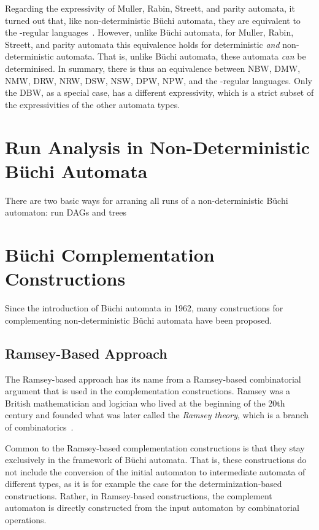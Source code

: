 Regarding the expressivity of Muller, Rabin, Streett, and parity automata, it turned out that, like non-deterministic Büchi automata, they are equivalent to the \om-regular languages~\cite{Thomas:1991}. However, unlike Büchi automata, for Muller, Rabin, Streett, and parity automata this equivalence holds for deterministic \textit{and} non-deterministic automata. That is, unlike Büchi automata, these automata \textit{can} be determinised. In summary, there is thus an equivalence between NBW, DMW, NMW, DRW, NRW, DSW, NSW, DPW, NPW, and the \om-regular languages. Only the DBW, as a special case, has a different expressivity, which is a strict subset of the expressivities of the other automata types. 



\section{Run Analysis in Non-Deterministic Büchi Automata}

There are two basic ways for arraning all runs of a non-deterministic Büchi automaton: run DAGs and trees~\cite{2014_wilke}


\section{Büchi Complementation Constructions}
Since the introduction of Büchi automata in 1962, many constructions for complementing non-deterministic Büchi automata have been proposed. 



\subsection{Ramsey-Based Approach}
The Ramsey-based approach has its name from a Ramsey-based combinatorial argument that is used in the complementation constructions. Ramsey was a British mathematician and logician who lived at the beginning of the 20th century and founded what was later called the \textit{Ramsey theory}, which is a branch of combinatorics~\cite{graham1990ramsey}.

Common to the  Ramsey-based complementation constructions is that they stay exclusively in the framework of Büchi automata. That is, these constructions do not include the conversion of the initial automaton to intermediate automata of different types, as it is for example the case for the determinization-based constructions. Rather, in Ramsey-based constructions, the complement automaton is directly constructed from the input automaton by combinatorial operations.

